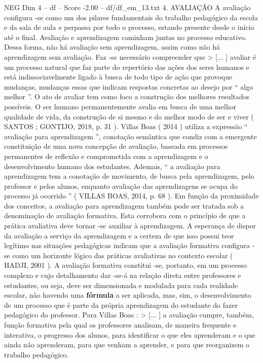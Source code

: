 \begin{textsample}{NEG Dim 4 – df – Score -2.00 – df/df\_em\_13.txt}  \label{ex:f4_neg_063}
4.
AVALIAÇÃO A avaliação configura -se como um dos pilares fundamentais do trabalho pedagógico da escola e da sala de aula e perpassa por todo o processo, estando presente desde o início até o final.
Avaliação e aprendizagem caminham juntas no processo educativo.
Dessa forma, não há avaliação sem aprendizagem, assim como não há aprendizagem sem avaliação.
Faz -se necessário compreender que > [... ] avaliar é um processo natural que faz parte do repertório das ações dos seres humanos e está indissociavelmente ligado à busca de todo tipo de ação que provoque mudanças, mudanças essas que indicam respostas concretas ao desejo por “ algo melhor ”.
O ato de avaliar tem como foco a construção dos melhores resultados possíveis.
O ser humano permanentemente avalia em busca de uma melhor qualidade de vida, da construção de si mesmo e do melhor modo de ser e viver ( SANTOS ; GONTIJO, 2018, p. 31 ).
Villas Boas ( 2014 ) utiliza a expressão “ avaliação para aprendizagem ”, conotação semântica que condiz com a emergente constituição de uma nova concepção de avaliação, baseada em processos permanentes de reflexão e comprometida com a aprendizagem e o desenvolvimento humano dos estudantes.
Ademais, “ a avaliação para aprendizagem tem a conotação de movimento, de busca pela aprendizagem, pelo professor e pelos alunos, enquanto avaliação das aprendizagens se ocupa do processo já ocorrido ” ( VILLAS BOAS, 2014, p. 68 ).
Em função da proximidade dos conceitos, a avaliação para aprendizagem também pode ser tratada sob a denominação de avaliação formativa.
Esta corrobora com o princípio de que a prática avaliativa deve tornar -se auxiliar à aprendizagem.
A esperança de dispor da avaliação a serviço da aprendizagem e a certeza de que isso possui teor legítimo nas situações pedagógicas indicam que a avaliação formativa configura -se como um horizonte lógico das práticas avaliativas no contexto escolar ( HADJI, 2001 ).
A avaliação formativa constitui -se, portanto, em um processo complexo e cujo detalhamento dar -se-á na relação direta entre professores e estudantes, ou seja, deve ser dimensionada e modulada para cada realidade escolar, não havendo uma \textbf{fórmula} a ser aplicada, mas, sim, o desenvolvimento de um processo que é parte da própria aprendizagem do estudante do fazer pedagógico do professor.
Para Villas Boas : > [... ] a avaliação cumpre, também, função formativa pela qual os professores analisam, de maneira frequente e interativa, o progresso dos alunos, para identificar o que eles aprenderam e o que ainda não aprenderam, para que venham a aprender, e para que reorganizem o trabalho pedagógico.

\end{textsample}
